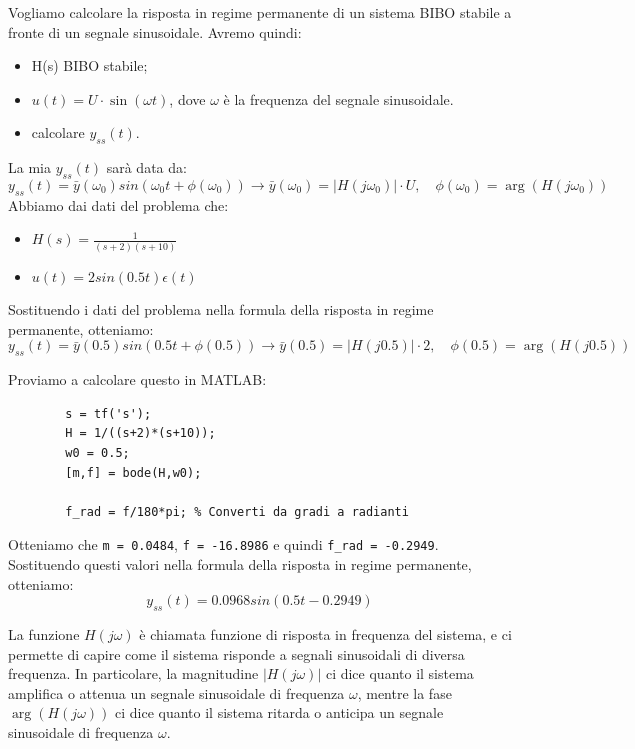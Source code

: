 \begin{tcolorbox}[title=Esempio funzione sinusoidale]
    Vogliamo calcolare la risposta in regime permanente di un sistema BIBO stabile a fronte di un segnale sinusoidale.
    Avremo quindi:
    \begin{itemize}
        \item H(s) BIBO stabile;
        \item $u(t) = U \cdot \sin(\omega t)$, dove $\omega$ è la frequenza del segnale sinusoidale.
        \item calcolare $y_{ss}(t)$.
    \end{itemize}
    La mia $y_{ss}(t)$ sarà data da:
    \begin{equation}
        y_{ss}(t) = \bar{y}(\omega_0)sin(\omega_0 t + \phi(\omega_0)) \rightarrow \bar{y}(\omega_0) = |H(j\omega_0)| \cdot U, \quad \phi(\omega_0) = \arg(H(j\omega_0))
    \end{equation}
    Abbiamo dai dati del problema che:
    \begin{itemize}
        \item $H(s) = \frac{1}{(s+2)(s+10)}$
        \item $u(t) = 2 sin(0.5t)\epsilon(t)$
    \end{itemize}
    Sostituendo i dati del problema nella formula della risposta in regime permanente, otteniamo:
    \begin{equation}
        y_{ss}(t) = \bar{y}(0.5)sin(0.5t + \phi(0.5)) \rightarrow \bar{y}(0.5) = |H(j0.5)| \cdot 2, \quad \phi(0.5) = \arg(H(j0.5))
    \end{equation}

    Proviamo a calcolare questo in MATLAB:
    \begin{verbatim}
        s = tf('s');
        H = 1/((s+2)*(s+10));
        w0 = 0.5;
        [m,f] = bode(H,w0);

        f_rad = f/180*pi; % Converti da gradi a radianti

    \end{verbatim}
    Otteniamo che \verb|m = 0.0484|, \verb|f = -16.8986| e quindi
    \verb|f_rad = -0.2949|. Sostituendo questi valori nella formula della risposta
    in regime permanente, otteniamo:
    \begin{equation}
        y_{ss}(t) = 0.0968sin(0.5t - 0.2949)
    \end{equation}

\end{tcolorbox}
La funzione $H(j\omega)$ è chiamata funzione di risposta in frequenza del sistema, e ci permette di capire come il sistema risponde a segnali sinusoidali di diversa frequenza. In particolare, la magnitudine $|H(j\omega)|$ ci dice quanto il sistema amplifica o attenua un segnale sinusoidale di frequenza $\omega$, mentre la fase $\arg(H(j\omega))$ ci dice quanto il sistema ritarda o anticipa un segnale sinusoidale di frequenza $\omega$.
